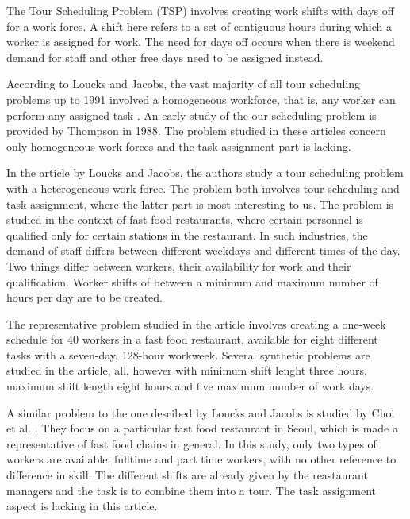 The Tour Scheduling Problem (TSP) involves creating work shifts with days off for a work force. A shift here refers to a set of contiguous hours during which a worker is assigned for work. The need for days off occurs when there is weekend demand for staff and other free days need to be assigned instead. 

According to Loucks and Jacobs, the vast majority of all tour scheduling problems up to 1991 involved a homogeneous workforce, that is, any worker can perform any assigned task \cite{loucks_1991}. An early study of the our scheduling problem is provided by Thompson in 1988. The problem studied in these articles concern only homogeneous work forces and the task assignment part is lacking.


In the article by Loucks and Jacobs, the authors study a tour scheduling problem with a heterogeneous work force. The problem both involves tour scheduling and task assignment, where the latter part is most interesting to us. The problem is studied in the context of fast food restaurants, where certain personnel is qualified only for certain stations in the restaurant. In such industries, the demand of staff differs between different weekdays and different times of the day. Two things differ between workers, their availability for work and their qualification. Worker shifts of between a minimum and maximum number of hours per day are to be created.

The representative problem studied in the article involves creating a one-week schedule for 40 workers in a fast food restaurant, available for eight different tasks with a seven-day, 128-hour workweek. Several synthetic problems are studied in the article, all, however with minimum shift lenght three hours, maximum shift length eight hours and five maximum number of work days.

A similar problem to the one descibed by Loucks and Jacobs is studied by Choi et al. \cite{choi_hwang_park_2009}. They focus on a particular fast food restaurant in Seoul, which is made a representative of fast food chains in general. In this study, only two types of workers are available; fulltime and part time workers, with no other reference to difference in skill. The different shifts are already given by the reastaurant managers and the task is to combine them into a tour. The task assignment aspect is lacking in this article.



